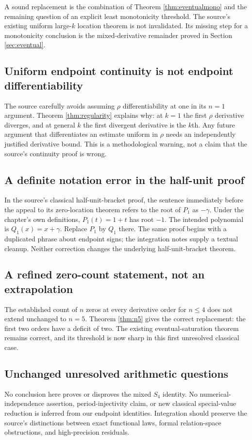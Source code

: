 \documentclass[11pt]{article}
\numberwithin{equation}{section}
\theoremstyle{definition}\newtheorem{definition}[theorem]{Definition}
\theoremstyle{remark}\newtheorem{remark}[theorem]{Remark}
\begin{document}
A sound replacement is the combination of Theorem \ref{thm:eventualmono} and the remaining question of an explicit least monotonicity threshold. The source's existing uniform large-$k$ location theorem is not invalidated. Its missing step for a monotonicity conclusion is the mixed-derivative remainder proved in Section \ref{sec:eventual}.

\subsection{Uniform endpoint continuity is not endpoint differentiability}
The source carefully avoids assuming $\rho$ differentiability at one in its $n=1$ argument. Theorem \ref{thm:regularity} explains why: at $k=1$ the first $\rho$ derivative diverges, and at general $k$ the first divergent derivative is the $k$th. Any future argument that differentiates an estimate uniform in $\rho$ needs an independently justified derivative bound. This is a methodological warning, not a claim that the source's continuity proof is wrong.

\subsection{A definite notation error in the half-unit proof}
In the source's classical half-unit-bracket proof, the sentence immediately before the appeal to its zero-location theorem refers to the root of $P_1$ as $-\gamma$. Under the chapter's own definitions, $P_1(t)=1+t$ has root $-1$. The intended polynomial is $Q_1(x)=x+\gamma$. Replace $P_1$ by $Q_1$ there. The same proof begins with a duplicated phrase about endpoint signs; the integration notes supply a textual cleanup. Neither correction changes the underlying half-unit-bracket theorem.

\subsection{A refined zero-count statement, not an extrapolation}
The established count of $n$ zeros at every derivative order for $n\leq4$ does not extend unchanged to $n=5$. Theorem \ref{thm:n5} gives the correct replacement: the first two orders have a deficit of two. The existing eventual-saturation theorem remains correct, and its threshold is now sharp in this first unresolved classical case.

\subsection{Unchanged unresolved arithmetic questions}
No conclusion here proves or disproves the mixed $S_4$ identity. No numerical-independence assertion, period-injectivity claim, or new classical special-value reduction is inferred from our endpoint identities. Integration should preserve the source's distinctions between exact functional laws, formal relation-space obstructions, and high-precision residuals.
\end{document}
